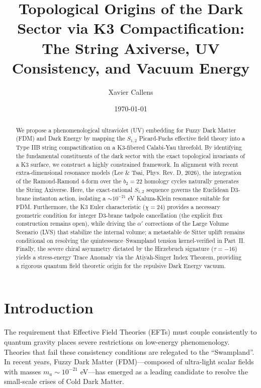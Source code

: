 \documentclass[aps,prd,twocolumn,nofootinbib,superscriptaddress,10pt]{revtex4-2}
\begin{document}
\title{Topological Origins of the Dark Sector via K3 Compactification:\\ The String Axiverse, UV Consistency, and Vacuum Energy}

\author{Xavier Callens}

\date{\today}

\begin{abstract}
We propose a phenomenological ultraviolet (UV) embedding for Fuzzy Dark Matter (FDM) and Dark Energy by mapping the $S_{1,2}$ Picard-Fuchs effective field theory into a Type IIB string compactification on a K3-fibered Calabi-Yau threefold. By identifying the fundamental constituents of the dark sector with the exact topological invariants of a K3 surface, we construct a highly constrained framework. In alignment with recent extra-dimensional resonance models (Lee \& Tsai, Phys. Rev. D, 2026), the integration of the Ramond-Ramond 4-form over the $b_2=22$ homology cycles naturally generates the String Axiverse. Here, the exact-rational $S_{1,2}$ sequence governs the Euclidean D3-brane instanton action, isolating a $\sim 10^{-21}$ eV Kaluza-Klein resonance suitable for FDM. Furthermore, the K3 Euler characteristic ($\chi=24$) provides a necessary geometric condition for integer D3-brane tadpole cancellation (the explicit flux construction remains open), while driving the $\alpha'$ corrections of the Large Volume Scenario (LVS) that stabilize the internal volume; a metastable de Sitter uplift remains conditional on resolving the quintessence--Swampland tension kernel-verified in Part~II. Finally, the severe chiral asymmetry dictated by the Hirzebruch signature ($\tau=-16$) yields a stress-energy Trace Anomaly via the Atiyah-Singer Index Theorem, providing a rigorous quantum field theoretic origin for the repulsive Dark Energy vacuum.
\end{abstract}

\maketitle

\section{Introduction}

The requirement that Effective Field Theories (EFTs) must couple consistently to quantum gravity places severe restrictions on low-energy phenomenology. Theories that fail these consistency conditions are relegated to the ``Swampland''. In recent years, Fuzzy Dark Matter (FDM)---composed of ultra-light scalar fields with masses $m_a \sim 10^{-21}$ eV---has emerged as a leading candidate to resolve the small-scale crises of Cold Dark Matter. 
\end{document}
